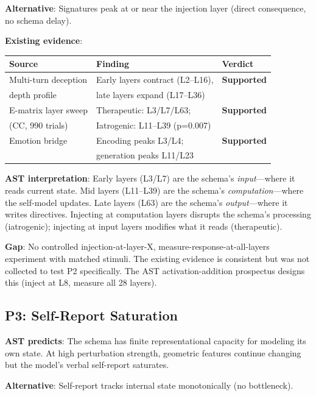 \documentclass[11pt,letterpaper]{article}
\begin{document}
\textbf{Alternative}: Signatures peak at or near the injection layer
(direct consequence, no schema delay).

\textbf{Existing evidence}:

\begin{table}[H]
\centering
\begin{tabular}{lll}
\toprule
Source & Finding & Verdict \\
\midrule
Multi-turn deception & Early layers contract (L2--L16), &
  \textbf{Supported} \\
depth profile & late layers expand (L17--L36) & \\
E-matrix layer sweep & Therapeutic: L3/L7/L63; &
  \textbf{Supported} \\
(CC, 990 trials) & Iatrogenic: L11--L39 (p=0.007) & \\
Emotion bridge & Encoding peaks L3/L4; &
  \textbf{Supported} \\
 & generation peaks L11/L23 & \\
\bottomrule
\end{tabular}
\end{table}

\textbf{AST interpretation}: Early layers (L3/L7) are the schema's
\emph{input}---where it reads current state. Mid layers (L11--L39) are
the schema's \emph{computation}---where the self-model updates. Late
layers (L63) are the schema's \emph{output}---where it writes
directives. Injecting at computation layers disrupts the schema's
processing (iatrogenic); injecting at input layers modifies what it
reads (therapeutic).

\textbf{Gap}: No controlled injection-at-layer-X,
measure-response-at-all-layers experiment with matched stimuli. The
existing evidence is consistent but was not collected to test P2
specifically. The AST activation-addition prospectus designs this
(inject at L8, measure all 28 layers).

\subsection{P3: Self-Report Saturation}

\textbf{AST predicts}: The schema has finite representational capacity
for modeling its own state. At high perturbation strength, geometric
features continue changing but the model's verbal self-report
saturates.

\textbf{Alternative}: Self-report tracks internal state monotonically
(no bottleneck).
\end{document}
